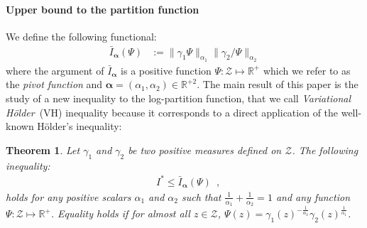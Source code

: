 \documentclass{article} %
\newcommand{\Holder}{H\"older\xspace}
\newcommand{\Zspace}{\mathcal{Z}}
\newcommand{\LSE}[3]{\bar{\mathbb{E}}_{#1}^{#2}\left[#3\right]}
\newcommand{\Expectation}[2]{\int{#2}d\nu(\Z)}
\def\X{X}
\def\Z{Z}
\def\z{z}
\renewcommand{\Re}{\mathbb{R}}
\newtheorem{theorem}{Theorem}
\begin{document}
\newcommand{\balpha}{{\bm{\alpha}}}

\paragraph{Upper bound to the partition function}
We define the following functional:
\begin{eqnarray}
\label{eq:VH}
\bar I_\balpha(\Psi)&:=
		\|\gamma_1\Psi\|_{\alpha_1}\|\gamma_2/\Psi\|_{\alpha_2}
\end{eqnarray}
where the argument of $\bar I_\balpha$ is a positive function $\Psi:\Zspace\mapsto \Re^+$ %
which we refer to as the \emph{pivot function}
and $\balpha=(\alpha_1,\alpha_2)\in\Re^{+2}$. 
The main result of this paper is the study of a new inequality to the log-partition function, that we call \emph{Variational \Holder}~(VH) inequality because it
corresponds to a direct application of the well-known \Holder's inequality:
\begin{theorem}
\label{th:VH}
Let $\gamma_1$ and $\gamma_2$ be two positive measures defined on $\Zspace$. 
The following inequality:
\begin{align}
\label{eq:VH-logspace}
&I^* \le \bar I_\balpha(\Psi)
\enspace,
\end{align}
holds for any positive scalars $\alpha_1$ and $\alpha_2$ such that $\frac{1}{\alpha_1} + \frac{1}{\alpha_2}=1$ and any function $\Psi:\Zspace\mapsto \Re^+$.
Equality holds if for almost all $\z\in\Zspace$, 
$\Psi(\z) = \gamma_1(\z)^{-\frac {1}{\alpha_2}}  \gamma_2(\z)^{\frac{1} {\alpha_1}}$.
\end{theorem}
\end{document}
